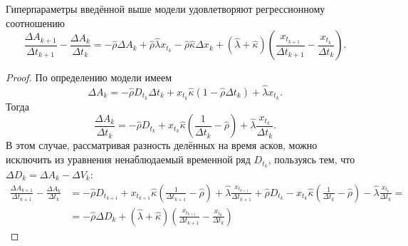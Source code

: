 \begin{theorem}
    Гиперпараметры введённой выше
    модели удовлетворяют регрессионному соотношению
    \begin{equation} \label{GenIntT}
        \frac{\Delta A_{k+1}}{\Delta t_{k+1}} - \frac{\Delta A_{k}}{\Delta t_{k}}= 
        -\hat \rho \Delta A_k + \hat \rho \hat \lambda x_{t_k} - \hat \rho \hat \kappa \Delta x_k
        + (\hat \lambda + \hat \kappa) \left(\frac{x_{t_{k+1}}}{\Delta t_{k+1}} - \frac{x_{t_k}}{\Delta t_{k}}\right).
    \end{equation}
\end{theorem}
\begin{proof}
    По определению модели имеем
    \begin{equation*}
        \Delta A_k = - \hat \rho D_{t_k} \Delta t_k + x_{t_k} \hat \kappa (1 - \hat \rho \Delta t_k) + \hat \lambda x_{t_k} .
    \end{equation*}
    Тогда
    \begin{equation*}
        \frac{\Delta A_k}{\Delta t_k} = - \hat \rho D_{t_{k}} + x_{t_{k}} \hat \kappa \left(\frac{1}{\Delta t_{k}} - \hat \rho \right) 
                + \hat \lambda \frac{x_{t_{k}}}{\Delta t_{k}}.
    \end{equation*}
    В этом случае,
    рассматривая разность делённых на время асков, можно
    исключить из уравнения ненаблюдаемый временной ряд $D_{t_k}$, пользуясь тем, что $\Delta D_k = \Delta A_k -  \Delta V_k$:
    \begin{align*}
        \frac{\Delta A_{k+1}}{\Delta t_{k+1}} - \frac{\Delta A_{k}}{\Delta t_{k}} & =
        - \hat \rho D_{t_{k+1}} + x_{t_{k+1}} \hat \kappa \left(\frac{1}{\Delta t_{k+1}} - \hat\rho \right) + \hat \lambda \frac{x_{t_{k+1}}}{\Delta t_{k+1}}
        + \hat \rho D_{t_{k}}   - x_{t_{k}}   \hat \kappa \left(\frac{1}{\Delta t_{k}} - \hat\rho \right)   - \hat \lambda \frac{x_{t_k}}    {\Delta t_{k}}
        =                                                                                                                                                                                                                 \\
                                                                                  & = -\hat \rho \Delta D_k + (\hat \lambda + \hat \kappa) \left(\frac{x_{t_{k+1}}}{\Delta t_{k+1}} - \frac{x_{t_k}}{\Delta t_{k}}\right)

\end{align*}
\end{proof}
